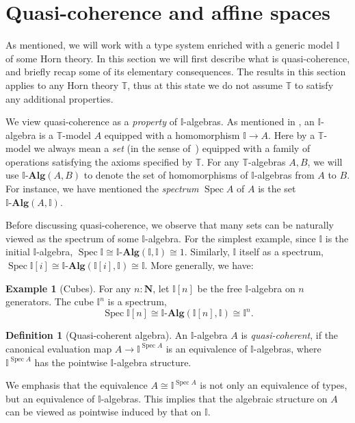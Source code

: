 \documentclass[12pt]{amsart}
\theoremstyle{definition}
\newtheorem{example}[theorem]{Example}
\newtheorem{definition}[theorem]{Definition}
\newcommand{\mb}[1]{\mathbf{#1}}
\newcommand{\mbb}[1]{\mathbb{#1}}
\newcommand{\T}{\mbb T}
\newcommand{\I}{\mbb I}
\newcommand{\alg}{\text{-}\mb{Alg}}
\newcommand{\N}{\mb N}
\newcommand{\spec}{\operatorname{Spec}}
\begin{document}
\section{Quasi-coherence and affine spaces}\label{sec:basics}

As mentioned, we will work with a type system enriched with a generic model $\I$ of some Horn theory. In this section we will first describe what is quasi-coherence, and briefly recap some of its elementary consequences. The results in this section applies to any Horn theory $\T$, thus at this state we do not assume $\T$ to satisfy any additional properties.

We view quasi-coherence as a \emph{property} of $\I$-algebras. As mentioned in , an $\I$-algebra is a $\T$-model $A$ equipped with a homomorphism $\I \to A$. Here by a $\T$-model we always mean a \emph{set} (in the sense of~\cite{hottbook}) equipped with a family of operations satisfying the axioms specified by $\T$. For any $\T$-algebras $A,B$, we will use $\I\alg(A,B)$ to denote the set of homomorphisms of $\I$-algebras from $A$ to $B$. For instance, we have mentioned the \emph{spectrum} $\spec A$ of $A$ is the set $\I\alg(A,\I)$.

Before discussing quasi-coherence, we observe that many sets can be naturally viewed as the spectrum of some $\I$-algebra. For the simplest example, since $\I$ is the initial $\I$-algebra, $\spec \I \cong \I\alg(\I,\I) \cong 1$. Similarly, $\I$ itself as a spectrum, $\spec \I[i] \cong \I\alg(\I[i],\I) \cong \I$. More generally, we have:

\begin{example}[Cubes]\label{exm:cubeaffine}
  For any $n:\N$, let $\I[n]$ be the free $\I$-algebra on $n$ generators. The cube $\I^n$ is a spectrum,
  \[ \spec \I[n] \cong \I\alg(\I[n],\I) \cong \I^n. \]
\end{example}

\begin{definition}[Quasi-coherent algebra]
  An $\I$-algebra $A$ is \emph{quasi-coherent}, if the canonical evaluation map $A \to \I^{\spec A}$ is an equivalence of $\I$-algebras, where $\I^{\spec A}$ has the pointwise $\I$-algebra structure.
\end{definition}

We emphasis that the equivalence $A \cong \I^{\spec A}$ is not only an equivalence of types, but an equivalence of $\I$-algebras. This implies that the algebraic structure on $A$ can be viewed as pointwise induced by that on $\I$. 
\end{document}
